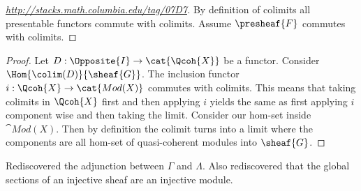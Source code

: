 \begin{proof}[\url{http://stacks.math.columbia.edu/tag/07D7}]
By definition of colimits all presentable functors commute with colimits. 
Assume $\presheaf{F}$ commutes with colimits.


\end{proof}

\begin{proof}
Let $D:\Opposite{I}\rightarrow \cat{\Qcoh{X}}$ be a functor. 
Consider $\Hom{\colim(D)}{\sheaf{G}}$. The inclusion functor $i:\Qcoh{X}\rightarrow \cat{Mod(X)}$ commutes with colimits. This means that taking colimits in $\Qcoh{X}$ first and then applying $i$ yields the same as first applying $i$ component wise and then taking the limit.
Consider our hom-set inside $\cat{Mod(X)}$. Then by definition the colimit turns into a limit where the components are all hom-set of quasi-coherent modules into $\sheaf{G}$. 
\end{proof}





\color{red}
Rediscovered the adjunction between $\Gamma$ and $\Lambda$. 
Also rediscovered that the global sections of an injective sheaf are an injective module.
\color{red}